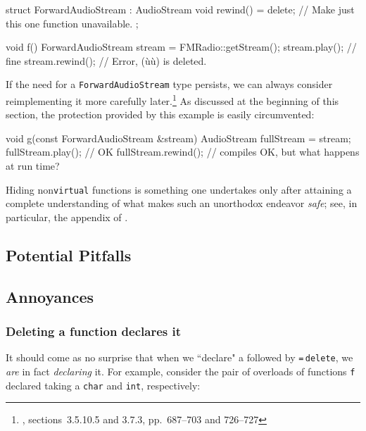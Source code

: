 \begin{emcppslisting}[emcppsbatch=e2]
struct ForwardAudioStream : AudioStream
{
    void rewind() = delete; // Make just this one function unavailable.
};

void f()
{
    ForwardAudioStream stream = FMRadio::getStream();
    stream.play();   // fine
    stream.rewind(); // Error, (ù{}ù) is deleted.
}
\end{emcppslisting}

\noindent If the need for a \lstinline!ForwardAudioStream! type persists, we can always
consider reimplementing it more carefully later.{\cprotect\footnote{\cite{lakos20}, sections~3.5.10.5 and 3.7.3, pp.~687--703 and 726--727}} As discussed at the beginning of this section, the protection provided by this example is easily circumvented:
\begin{emcppslisting}[emcppsbatch=e2]
void g(const ForwardAudioStream &stream)
{
    AudioStream fullStream = stream;
    fullStream.play();   // OK
    fullStream.rewind(); // compiles OK, but what happens at run time?
}
\end{emcppslisting}

\noindent Hiding non\lstinline!virtual! functions is something one undertakes only after attaining a complete understanding of what makes such an unorthodox endeavor \emph{safe}; see, in particular, the appendix of .

\subsection[Potential Pitfalls]{Potential Pitfalls}\label{potential-pitfalls}

\hspace*{\fill}
\newpage%

\subsection[Annoyances]{Annoyances}\label{annoyances}

\subsubsection[Deleting a function declares it]{Deleting a function declares it}

It should come as no surprise that when we ``declare" a 
followed by \lstinline!=!\,\lstinline!delete!, we \emph{are} in fact \emph{declaring} it.  For example, consider
the pair of overloads of functions \lstinline!f! declared taking a \lstinline!char! and \lstinline!int!,
respectively:

